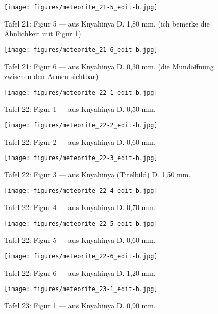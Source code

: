 \documentclass[a4paper, 12pt, oneside]{article}
\begin{document}
\begin{figure}[t]
\texttt{[image: figures/meteorite\_21-5\_edit-b.jpg]}
\caption{Tafel 21: Figur 5 --- aus Knyahinya D. 1,80 mm. (ich bemerke die Ähnlichkeit mit Figur 1)}
\centering
\end{figure}
\clearpage
\begin{figure}[t]
\texttt{[image: figures/meteorite\_21-6\_edit-b.jpg]}
\caption{Tafel 21: Figur 6 --- aus Knyahinya D. 0,30 mm. (die Mundöffnung zwischen den Armen sichtbar)}
\centering
\end{figure}
\clearpage
{}
\begin{figure}[t]
\texttt{[image: figures/meteorite\_22-1\_edit-b.jpg]}
\caption{Tafel 22: Figur 1 --- aus Knyahinya D. 0,50 mm.}
\centering
\end{figure}
\clearpage
\begin{figure}[t]
\texttt{[image: figures/meteorite\_22-2\_edit-b.jpg]}
\caption{Tafel 22: Figur 2 --- aus Knyahinya D. 0,60 mm.}
\centering
\end{figure}
\clearpage
\begin{figure}[t]
\texttt{[image: figures/meteorite\_22-3\_edit-b.jpg]}
\caption{Tafel 22: Figur 3 --- aus Knyahinya (Titelbild) D. 1,50 mm.}
\centering
\end{figure}
\clearpage
\begin{figure}[t]
\texttt{[image: figures/meteorite\_22-4\_edit-b.jpg]}
\caption{Tafel 22: Figur 4 --- aus Knyahinya D. 0,70 mm.}
\centering
\end{figure}
\clearpage
\begin{figure}[t]
\texttt{[image: figures/meteorite\_22-5\_edit-b.jpg]}
\caption{Tafel 22: Figur 5 --- aus Knyahinya D. 0,60 mm.}
\centering
\end{figure}
\clearpage
\begin{figure}[t]
\texttt{[image: figures/meteorite\_22-6\_edit-b.jpg]}
\caption{Tafel 22: Figur 6 --- aus Knyahinya D. 1,20 mm.}
\centering
\end{figure}
\clearpage
{}
\begin{figure}[t]
\texttt{[image: figures/meteorite\_23-1\_edit-b.jpg]}
\caption{Tafel 23: Figur 1 --- aus Knyahinya D. 0,90 mm.}
\centering
\end{figure}
\end{document}
